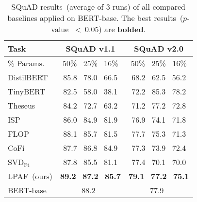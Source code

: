 \begin{table}[t]
	\centering
	\footnotesize
	\begin{tabular}{l|cc}
		\toprule
		Task &\textbf{SQuAD v1.1 }&\textbf{SQuAD v2.0  }                                           \\
		\midrule
		\% Params.   &50\% ~25\%  ~16\% &50\% ~25\%  ~16\%    \\
				\hline
		DistilBERT  &85.8~ 78.0~ 66.5 &68.2~ 62.5~ 56.2    \\
		TinyBERT    &82.5~ 58.0~ 38.1 &72.2~ 85.3~ 78.2         \\
				\hline
		Theseus &84.2~ 72.7~ 63.2 &71.2~ 77.2~ 72.8                                    \\
				\hline
		ISP  &86.0~ 84.9~ 81.9 &76.9~ 74.1~ 71.8                                            \\
		FLOP  &88.1~ 85.7~ 81.5 &77.7~ 75.3~ 71.3                                            \\
		CoFi  &87.7~ 86.8~ 84.9 &77.3~ 73.9~ 72.4                                               \\
		
				\hline
		SVD$_{\text{Ft}}$  &87.8~ 85.5~ 81.1 &77.4~ 70.1~ 70.0     \\
		
		LPAF~(ours)  &\textbf{89.2}~ \textbf{87.2}~ \textbf{85.7} &\textbf{79.1}~ \textbf{77.2}~ \textbf{75.1}  \\
		\midrule
		BERT-base  &~~88.2~~~ &~~77.9~~~  \\
		\bottomrule
	\end{tabular}
	\caption{SQuAD results~(average of 3 runs) of all compared baselines applied on BERT-base. The best results~($p$-value ~<~0.05) are \textbf{bolded}.}
	\label{table:squad}
\end{table}
